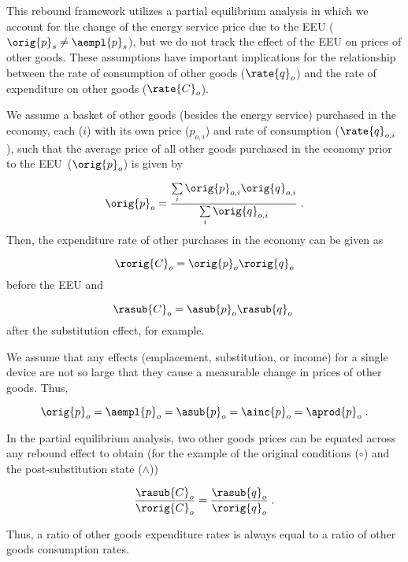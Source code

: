 

This rebound framework utilizes
a partial equilibrium analysis
in which we account for the change of the energy service price
due to the EEU ($\orig{p}_s \neq \aempl{p}_s$), but 
we do not track the effect of the EEU on prices of other goods.
These assumptions have important implications for the relationship between 
the rate of consumption of other goods ($\rate{q}_o$) and 
the rate of expenditure on other goods ($\rate{C}_o$).

We assume a basket of other goods (besides the energy service) 
purchased in the economy,
each ($i$) with its own price ($p_{o,i}$) and rate of consumption ($\rate{q}_{o,i}$),
such that the average price of all other goods purchased in the economy
prior to the EEU~($\orig{p}_o$) is given by

\begin{equation}
  \orig{p}_o = \frac{\sum\limits_i \orig{p}_{o,i} \orig{q}_{o,i}}{\sum\limits_i \orig{q}_{o,i}} \; .
\end{equation}
%
Then, the expenditure rate of other purchases in the economy can be given as

\begin{equation}
  \rorig{C}_o = \orig{p}_o \rorig{q}_o
\end{equation}
%
before the EEU and

\begin{equation}
  \rasub{C}_o = \asub{p}_o \rasub{q}_o \; 
\end{equation}
%
after the substitution effect, for example.

We assume that any effects (emplacement, substitution, or income)
for a single device 
are not so large that they 
cause a measurable change in prices of other goods. 
Thus, 

\begin{equation}
  \orig{p}_o = \aempl{p}_o = \asub{p}_o = \ainc{p}_o = \aprod{p}_o \; .
\end{equation}

In the partial equilibrium analysis, 
two other goods prices can be equated 
across any rebound effect
to obtain
(for the example of the original conditions ($\circ$) 
and the post-substitution state ($\wedge$))

\begin{equation} \label{eq:qo_Co_equality}
  \frac{\rasub{C}_o}{\rorig{C}_o} 
      = \frac{\rasub{q}_o}{\rorig{q}_o} \; .
\end{equation}

Thus, a ratio of other goods expenditure rates
is always equal to a ratio of other goods consumption rates.









